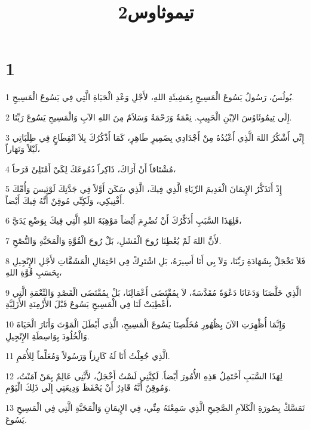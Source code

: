 

\title{تيموثاوس2}


\chapter{1}

\par 1 بُولُسُ، رَسُولُ يَسُوعَ الْمَسِيحِ بِمَشِيئَةِ اللهِ، لأَجْلِ وَعْدِ الْحَيَاةِ الَّتِي فِي يَسُوعَ الْمَسِيحِ.
\par 2 إِلَى تِيمُوثَاوُسَ الاِبْنِ الْحَبِيبِ. نِعْمَةٌ وَرَحْمَةٌ وَسَلاَمٌ مِنَ اللهِ الآبِ وَالْمَسِيحِ يَسُوعَ رَبِّنَا.
\par 3 إِنِّي أَشْكُرُ اللهَ الَّذِي أَعْبُدُهُ مِنْ أَجْدَادِي بِضَمِيرٍ طَاهِرٍ، كَمَا أَذْكُرُكَ بِلاَ انْقِطَاعٍ فِي طِلْبَاتِي لَيْلاً وَنَهَاراً،
\par 4 مُشْتَاقاً أَنْ أَرَاكَ، ذَاكِراً دُمُوعَكَ لِكَيْ أَمْتَلِئَ فَرَحاً،
\par 5 إِذْ أَتَذَكَّرُ الإِيمَانَ الْعَدِيمَ الرِّيَاءِ الَّذِي فِيكَ، الَّذِي سَكَنَ أَوَّلاً فِي جَدَّتِكَ لَوْئِيسَ وَأُمِّكَ أَفْنِيكِي، وَلَكِنِّي مُوقِنٌ أَنَّهُ فِيكَ أَيْضاً.
\par 6 فَلِهَذَا السَّبَبِ أُذَكِّرُكَ أَنْ تُضْرِمَ أَيْضاً مَوْهِبَةَ اللهِ الَّتِي فِيكَ بِوَضْعِ يَدَيَّ،
\par 7 لأَنَّ اللهَ لَمْ يُعْطِنَا رُوحَ الْفَشَلِ، بَلْ رُوحَ الْقُوَّةِ وَالْمَحَبَّةِ وَالنُّصْحِ.
\par 8 فَلاَ تَخْجَلْ بِشَهَادَةِ رَبِّنَا، وَلاَ بِي أَنَا أَسِيرَهُ، بَلِ اشْتَرِكْ فِي احْتِمَالِ الْمَشَقَّاتِ لأَجْلِ الإِنْجِيلِ بِحَسَبِ قُوَّةِ اللهِ،
\par 9 الَّذِي خَلَّصَنَا وَدَعَانَا دَعْوَةً مُقَدَّسَةً، لاَ بِمُقْتَضَى أَعْمَالِنَا، بَلْ بِمُقْتَضَى الْقَصْدِ وَالنِّعْمَةِ الَّتِي أُعْطِيَتْ لَنَا فِي الْمَسِيحِ يَسُوعَ قَبْلَ الأَزْمِنَةِ الأَزَلِيَّةِ،
\par 10 وَإِنَّمَا أُظْهِرَتِ الآنَ بِظُهُورِ مُخَلِّصِنَا يَسُوعَ الْمَسِيحِ، الَّذِي أَبْطَلَ الْمَوْتَ وَأَنَارَ الْحَيَاةَ وَالْخُلُودَ بِوَاسِطَةِ الإِنْجِيلِ.
\par 11 الَّذِي جُعِلْتُ أَنَا لَهُ كَارِزاً وَرَسُولاً وَمُعَلِّماً لِلأُمَمِ.
\par 12 لِهَذَا السَّبَبِ أَحْتَمِلُ هَذِهِ الأُمُورَ أَيْضاً. لَكِنَّنِي لَسْتُ أَخْجَلُ، لأَنَّنِي عَالِمٌ بِمَنْ آمَنْتُ، وَمُوقِنٌ أَنَّهُ قَادِرٌ أَنْ يَحْفَظَ وَدِيعَتِي إِلَى ذَلِكَ الْيَوْمِ.
\par 13 تَمَسَّكْ بِصُورَةِ الْكَلاَمِ الصَّحِيحِ الَّذِي سَمِعْتَهُ مِنِّي، فِي الإِيمَانِ وَالْمَحَبَّةِ الَّتِي فِي الْمَسِيحِ يَسُوعَ.
